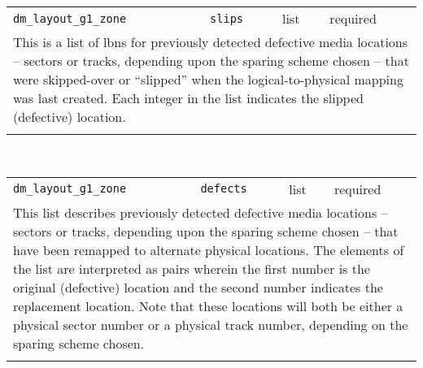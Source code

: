 \noindent 
\begin{tabular}{|p{\lpmodwidth}|p{\lpnamewidth}|p{0.5in}|p{0.5in}|}
\cline{1-4}
\texttt{dm\_layout\_g1\_zone} & \texttt{slips} & list & required \\ 
\cline{1-4}
\multicolumn{4}{|p{6in}|}{
This is a list of lbns for previously detected defective media
locations -- sectors or tracks, depending upon the sparing scheme
chosen -- that were skipped-over or ``slipped'' when the
logical-to-physical mapping was last created. Each integer in the
list indicates the slipped (defective) location.
}\\ 
\cline{1-4}
\multicolumn{4}{p{5in}}{}\\
\end{tabular}\\ 
\noindent 
\begin{tabular}{|p{\lpmodwidth}|p{\lpnamewidth}|p{0.5in}|p{0.5in}|}
\cline{1-4}
\texttt{dm\_layout\_g1\_zone} & \texttt{defects} & list & required \\ 
\cline{1-4}
\multicolumn{4}{|p{6in}|}{
This list describes previously detected defective media
locations -- sectors or tracks, depending upon the sparing scheme
chosen -- that have been remapped to alternate physical locations.
The elements of the list are interpreted as pairs wherein the first
number is the original (defective) location and the second number
indicates the replacement location. Note that these locations
will both be either a physical sector number or a physical track
number, depending on the sparing scheme chosen.
}\\ 
\cline{1-4}
\multicolumn{4}{p{5in}}{}\\
\end{tabular}\\ 
